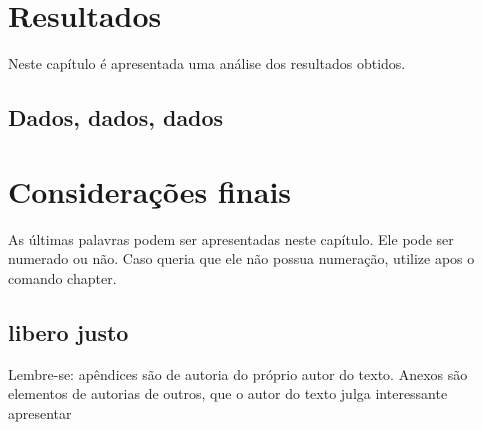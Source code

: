 \documentclass[
	12pt,				%
	openright,			%
	oneside,			%
	a4paper,			%
	english,			%
	brazil				%
	]{abntex2}
\begin{document}
\chapter{Resultados} \label{cap:resultados}

Neste capítulo é apresentada uma análise dos resultados obtidos.

\section{Dados, dados, dados}
\lipsum[21]

\chapter{Considerações finais}
As últimas palavras podem ser apresentadas neste capítulo. Ele pode ser numerado ou não. Caso queria que ele não possua numeração, utilize \* apos o comando chapter.

\lipsum[21]

\postextual

\printbibliography%

%
%

\begin{apendicesenv}


\chapter{libero justo}
Lembre-se: apêndices são de autoria do próprio autor do texto. Anexos são elementos de autorias de outros, que o autor do texto julga interessante apresentar


\end{apendicesenv}
\end{document}
